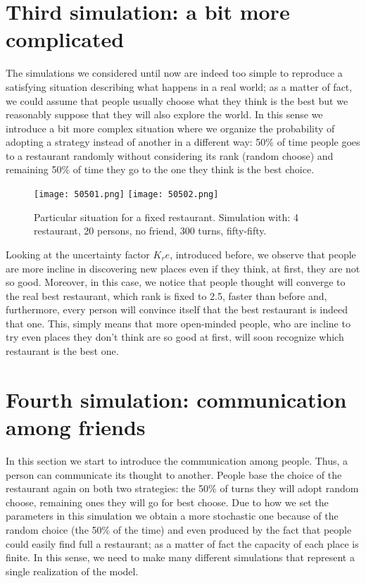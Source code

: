 \documentclass[12pt]{book}
\begin{document}
\section{Third simulation: a bit more complicated}
The simulations we considered until now are indeed too simple to reproduce a satisfying situation describing what happens in a real world; as a matter of fact, we could assume that people usually choose what they think is the best but we reasonably suppose that they will also explore the world. 
In this sense we introduce a bit more complex situation where we organize the probability of adopting a strategy instead of another in a different way: 50\% of time people goes to a restaurant randomly without considering its rank (random choose) and  remaining 50\% of time they go to the one they think is the best choice.
\begin{figure}[h]
  \centering
  \texttt{[image: 50501.png]}
  \texttt{[image: 50502.png]}
  \caption{Particular situation for a fixed restaurant. Simulation with: 4 restaurant, 20 persons, no friend, 300 turns, fifty-fifty.}
\end{figure}
Looking at the uncertainty factor $K_re$, introduced before, we observe that people are more incline in discovering new places even if they think, at first, they are not so good.
Moreover, in this case, we notice that people thought will converge to the real best restaurant, which rank is fixed to 2.5, faster than before and, furthermore, every person will convince itself that the best restaurant is indeed that one. 
This, simply means that more open-minded people, who are incline to try even places they don’t think are so good at first, will soon recognize which restaurant is the best one.



\section{Fourth simulation: communication among friends }
In this section we start to introduce the communication among people. Thus, a person can communicate its thought to another. 
People base the choice of the restaurant again on both two strategies: the 50\% of turns they will adopt random choose, remaining ones they will go for best  choose.
Due to how we set the parameters in this simulation we obtain a more stochastic one because of the random choice (the 50\% of the time) and even produced by the fact that people could easily find full a restaurant; as a matter of fact the capacity of each place is finite.
In this sense, we need to make many different simulations that represent a single realization of the model.
\end{document}
